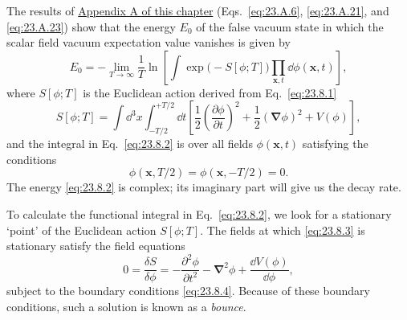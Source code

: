 The results of \hyperref[app:23.A]{Appendix A of this chapter} (Eqs.~\eqref{eq:23.A.6}, \eqref{eq:23.A.21}, and \eqref{eq:23.A.23}) show that the energy $E_0$ of the false vacuum state in which the scalar field vacuum expectation value vanishes is given by
\begin{equation}
 E_0=-\lim_{T\to\infty}\frac{1}{T}\ln\left[
 \int\exp\bigl(-S[\phi;T]\bigr)
 \prod_{\mathbf x,t}\dd\phi(\mathbf x,t)
 \right],
 \tag{23.8.2}\label{eq:23.8.2}
\end{equation}
where $S[\phi;T]$ is the Euclidean action derived from Eq.~\eqref{eq:23.8.1}
\begin{equation}
 S[\phi;T]=\int \dd^3x\int_{-T/2}^{+T/2}\dd t
 \left[
 \frac{1}{2}\left(\frac{\partial\phi}{\partial t}\right)^2
 +\frac{1}{2}(\boldsymbol\nabla\phi)^2+V(\phi)
 \right],
 \tag{23.8.3}\label{eq:23.8.3}
\end{equation}
and the integral in Eq.~\eqref{eq:23.8.2} is over all fields $\phi(\mathbf x,t)$ satisfying the conditions
\begin{equation}
 \phi(\mathbf x,T/2)=\phi(\mathbf x,-T/2)=0.
 \tag{23.8.4}\label{eq:23.8.4}
\end{equation}
The energy \eqref{eq:23.8.2} is complex; its imaginary part will give us the decay rate.

To calculate the functional integral in Eq.~\eqref{eq:23.8.2}, we look for a stationary `point' of the Euclidean action $S[\phi;T]$. The fields at which \eqref{eq:23.8.3} is stationary satisfy the field equations
\begin{equation}
 0=\frac{\delta S}{\delta\phi}
 =-\frac{\partial^2\phi}{\partial t^2}
 -\boldsymbol\nabla^2\phi+\frac{\dd V(\phi)}{\dd\phi},
 \tag{23.8.5}\label{eq:23.8.5}
\end{equation}
subject to the boundary conditions \eqref{eq:23.8.4}. Because of these boundary conditions, such a solution is known as a \emph{bounce}.

